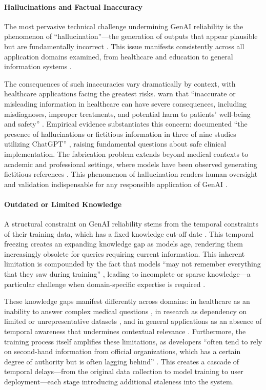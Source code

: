 \paragraph{Hallucinations and Factual Inaccuracy}
The most pervasive technical challenge undermining GenAI reliability is the phenomenon of ``hallucination''—the generation of outputs that appear plausible but are fundamentally incorrect \parencite{R02,R03,R08,R10,S09}. This issue manifests consistently across all application domains examined, from healthcare \parencite{S01, S02, S03, S05, S10, S11, S16, S17} and education \parencite{S14} to general information systems \parencite{R02, R03, R04, R05, R06, R07, R08}.

The consequences of such inaccuracies vary dramatically by context, with healthcare applications facing the greatest risks. \citeauthor{S02} warn that \enquote{inaccurate or misleading information in healthcare can have severe consequences, including misdiagnoses, improper treatments, and potential harm to patients' well-being and safety} \parencite*{S02}. Empirical evidence substantiates this concern: \citeauthor{S05} documented \enquote{the presence of hallucinations or fictitious information in three of nine studies utilizing ChatGPT} \parencite*{S05}, raising fundamental questions about safe clinical implementation. The fabrication problem extends beyond medical contexts to academic and professional settings, where models have been observed generating fictitious references \parencite{S14}. This phenomenon of hallucination renders human oversight and validation indispensable for any responsible application of GenAI \parencite{R02, R05}.

\paragraph{Outdated or Limited Knowledge}
A structural constraint on GenAI reliability stems from the temporal constraints of their training data, which has a fixed knowledge cut-off date \parencite{R04, R06, S14}. This temporal freezing creates an expanding knowledge gap as models age, rendering them increasingly obsolete for queries requiring current information. This inherent limitation is compounded by the fact that models \enquote{may not remember everything that they saw during training} \parencite{R04}, leading to incomplete or sparse knowledge—a particular challenge when domain-specific expertise is required \parencite{S07, S10, S11}.

These knowledge gaps manifest differently across domains: in healthcare as an inability to answer complex medical questions \parencite{S11}, in research as dependency on limited or unrepresentative datasets \parencite{S07}, and in general applications as an absence of temporal awareness that undermines contextual relevance \parencite{R06}. Furthermore, the training process itself amplifies these limitations, as developers \enquote{often tend to rely on second-hand information from official organizations, which has a certain degree of authority but is often lagging behind} \parencite{S11}. This creates a cascade of temporal delays—from the original data collection to model training to user deployment—each stage introducing additional staleness into the system.

